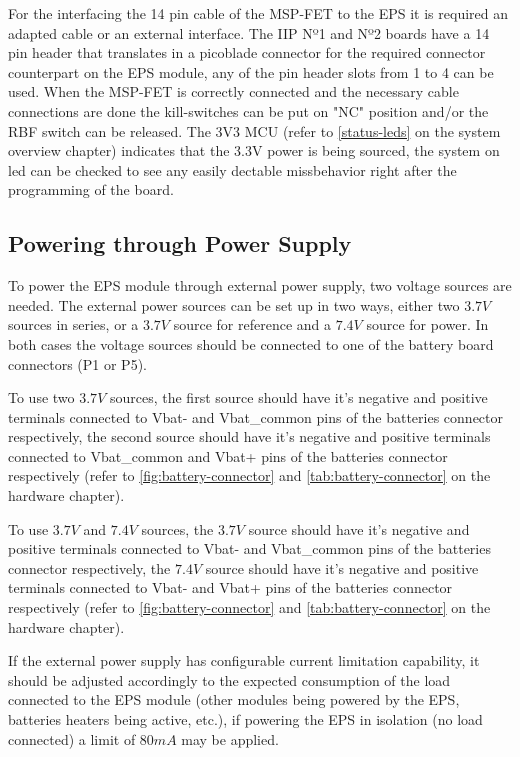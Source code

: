 For the interfacing the 14 pin cable of the MSP-FET to the EPS it is required an adapted cable or an external interface. 
The IIP\cite{iip} Nº1 and Nº2 boards have a 14 pin header that translates in a picoblade connector for the required connector counterpart on the EPS module, any of the pin header slots from 1 to 4 can be used.
When the MSP-FET is correctly connected and the necessary cable connections are done the kill-switches can be put on "NC" position and/or the RBF switch can be released.
The 3V3 MCU (refer to \autoref{status-leds} on the system overview chapter) indicates that the 3.3V power is being sourced, the system on led can be checked to see any easily dectable missbehavior right after the programming of the board. 



\subsection{Powering through Power Supply}

To power the EPS module through external power supply, two voltage sources are needed.
The external power sources can be set up in two ways, either two \(3.7 V\) sources in series, or a \(3.7 V\) source for reference and a \(7.4 V\) source for power.
In both cases the voltage sources should be connected to one of the battery board connectors (P1 or P5).

To use two \(3.7 V\) sources, the first source should have it's negative and positive terminals connected to Vbat- and Vbat\_common pins of the batteries connector respectively, the second source should have it's negative and positive terminals connected to Vbat\_common and Vbat+ pins of the batteries connector respectively (refer to \autoref{fig:battery-connector} and \autoref{tab:battery-connector} on the hardware chapter).

To use \(3.7 V\) and \(7.4 V\) sources, the \(3.7 V\) source should have it's negative and positive terminals connected to Vbat- and Vbat\_common pins of the batteries connector respectively, the \(7.4 V\) source should have it's negative and positive terminals connected to Vbat- and Vbat+ pins of the batteries connector respectively (refer to \autoref{fig:battery-connector} and \autoref{tab:battery-connector} on the hardware chapter).

If the external power supply has configurable current limitation capability, it should be adjusted accordingly to the expected consumption of the load connected to the EPS module (other modules being powered by the EPS, batteries heaters being active, etc.), if powering the EPS in isolation (no load connected) a limit of \(80 mA\) may be applied.

